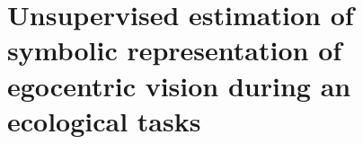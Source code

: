 













\section{Unsupervised estimation of symbolic representation of egocentric vision during an ecological tasks}







